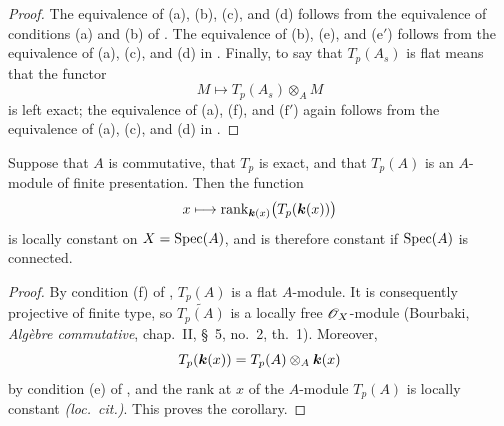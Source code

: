 \begin{proof}
The equivalence of (a), (b), (c), and (d) follows from the
equivalence of conditions (a) and (b) of .
The equivalence of (b), (e), and ($\mathrm{e}'$) follows from
the equivalence of (a), (c), and (d) in .
Finally, to say that $T_p(A_s)$ is flat means that the functor
\[
  M\longmapsto T_p(A_s)\otimes_A M
\]
is left exact; the equivalence of (a), (f), and
($\mathrm{f}'$) again follows from the equivalence of (a), (c),
and (d) in .
\end{proof}


\begin{corollary}[7.3.4]
\label{III.7.3.4}
Suppose that $A$ is commutative, that $T_p$ is exact, and that
$T_p(A)$ is an $A$-module of finite presentation.  Then the
function
\[
  x\longmapsto
  \operatorname{rank}_{\boldsymbol{k}(x)}
  \bigl(T_p(\boldsymbol{k}(x))\bigr)
\]
is locally constant on $X=\operatorname{Spec}(A)$, and is therefore constant
if $\operatorname{Spec}(A)$ is connected.
\end{corollary}

\begin{proof}
By condition (f) of , $T_p(A)$ is a flat
$A$-module.  It is consequently projective of finite type, so
$\widetilde{T_p(A)}$ is a locally free $\mathscr{O}_X$-module
(Bourbaki, \emph{Alg\`ebre commutative}, chap.~II, \S~5,
no.~2, th.~1).  Moreover,
\[
  T_p(\boldsymbol{k}(x))
  =
  T_p(A)\otimes_A\boldsymbol{k}(x)
\]
by condition (e) of , and the rank at $x$ of
the $A$-module $T_p(A)$ is locally constant
\emph{(loc.\ cit.)}.  This proves the corollary.
\end{proof}

